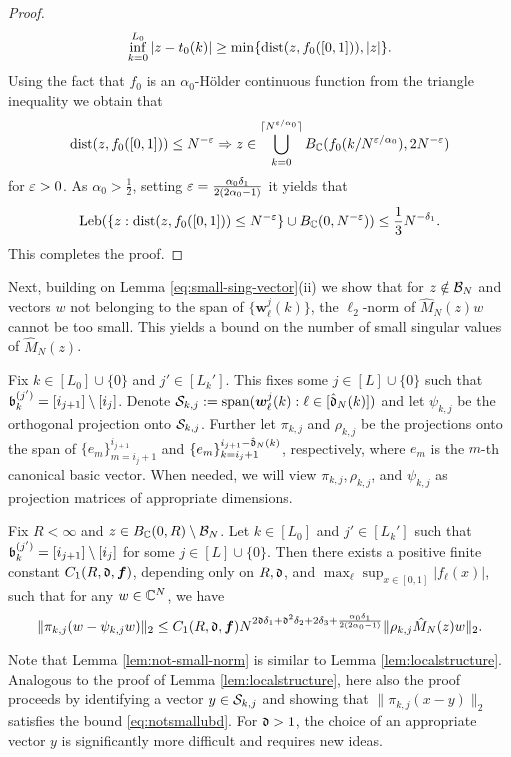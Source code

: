 \documentclass{amsart}
\numberwithin{equation}{section}
\def\corAB{}
\def\corABrev{\textcolor{black}}
\begin{document}
\begin{proof}
{\[
\inf_{k =0}^{L_0} |z - t_0(k)| \ge \min\{ {\rm dist}(z, f_0([0,1])), |z|\}.
\]
Using the fact that $f_0$ is an $\alpha_0$-H\"{o}lder continuous function from the triangle inequality we obtain that
\[
{\rm dist}(z, f_0([0,1])) \le N^{-\varepsilon} \Rightarrow z \in \bigcup_{k =0}^{\lceil N^{\varepsilon/\alpha_0}\rceil} B_{\mathbb{C}}(f_0(k/N^{\varepsilon/\alpha_0}), 2 N^{-\varepsilon})
\]
for $\varepsilon >0$. As $\alpha_0 > \frac12$, setting $\varepsilon = \frac{\alpha_0 \delta_1}{2(2\alpha_0 -1)}$ it yields that
\[
{\rm Leb}(\{z: {\rm dist}(z, f_0([0,1])) \le N^{-\varepsilon}\} \cup B_{\mathbb{C}}(0,N^{-\varepsilon})) \le \frac13 N^{-\delta_1}.
\]
This completes the proof.}
\end{proof}


Next, building on Lemma \ref{eq:small-sing-vector}(ii)
we show that for $z \notin \mathcal{B}_N$ and vectors $w$ not
belonging to the span of $\{{\bm w}_\ell^j(k)\}$,
the $\ell_2$-norm of $\hat{M}_N(z) w$ cannot be too small.
This yields a bound on the number of small singular values of $\hat{M}_N(z)$.

Fix $k \in [L_0] \cup \{0\}$ and $j' \in [L_k']$. This fixes some $j \in [L] \cup\{0\}$ such that $\mathfrak{b}_k^{(j')}=[i_{j+1}] \setminus [i_j]$. Denote $\mathcal{S}_{k,j}:=\operatorname{span}({\bm w}_\ell^j(k): \ell \in [\hat{\mathfrak{d}}_N(k)])$ and let $\psi_{k,j}$ be the orthogonal projection onto $\mathcal{S}_{k,j}$.
Further let
$\pi_{k,j}$ and $\rho_{k,j}$ be the projections onto the span of $\{e_m\}_{m=i_j+1}^{i_{j+1}}$ and $\{e_m\}_{k=i_j+1}^{i_{j+1}-\corAB{\hat\gd_N}(k)}$, respectively, where $e_m$ is the $m$-th canonical basic vector. When needed, we will view $\pi_{k,j}, \rho_{k,j}$, and $\psi_{k,j}$ as projection matrices of appropriate dimensions.



\begin{lemma}\label{lem:not-small-norm}
Fix $R<\infty$ and $z \in B_{\mathbb{C}}(0,R) \setminus \mathcal{B}_N$. Let $k \in [L_0]$ and $j' \in [L_k']$ such that $\mathfrak{b}_k^{(j')}= [i_{j+1}] \setminus [i_j]$ for some $j \in [L] \cup\{0\}$. Then there exists a positive finite constant $C_1(R,\mathfrak{d}, {\bm f})$, depending only on $R, \mathfrak{d}$, and $\max_\ell \sup_{x \in [0,1]}|f_\ell(x)|$, such that for any $w \in \mathbb{C}^N$, we have
\begin{equation}\label{eq:notsmallubd}
\|\pi_{k,j}(w -\psi_{k,j} w)\|_2 \le  C_1(R,\gd, {\bm f}) N^{2\gd\delta_1+ \gd^2 \delta_2+2\delta_3 +\corABrev{\frac{\alpha_0\delta_1}{2(2\alpha_0-1)}}}\|\rho_{k,j} \hat{M}_N(z) w\|_2.
\end{equation}
\end{lemma}

\corAB{Note that Lemma \ref{lem:not-small-norm} is similar to Lemma \ref{lem:localstructure}. Analogous to the proof of Lemma \ref{lem:localstructure}, here also the proof proceeds by identifying a vector $y \in \mathcal{S}_{k,j}$ and showing that $\|\pi_{k,j}(x-y)\|_2$ satisfies the bound \eqref{eq:notsmallubd}. For $\mathfrak{d} >1$, the choice of an appropriate vector $y$ is significantly more difficult and requires new ideas.}
\end{document}
